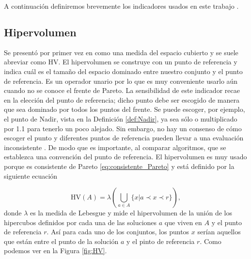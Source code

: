 A continuación definiremos brevemente los indicadores usados en este trabajo .

\subsection{Hipervolumen} \label{sec:HV}

Se presentó por primer vez en \cite{zitzlerMultiobjectiveOptimizationUsing1998} como una medida del espacio cubierto y se suele abreviar como HV. 
El hipervolumen se construye con un punto de referencia y indica cuál es el tamaño del espacio dominado entre nuestro conjunto y el punto de referencia. Es un operador unario por lo que es muy conveniente usarlo aún cuando no se conoce el frente de Pareto. La sensibilidad de este indicador recae en la elección del punto de referencia; dicho  punto debe ser escogido de manera que sea dominado por todos los puntos del frente. Se puede escoger, por ejemplo, el punto de Nadir, vista en la Definición \ref{def:Nadir}, ya sea sólo o multiplicado por 1.1 para tenerlo un poco alejado. Sin embargo, no hay un consenso de cómo escoger el punto y diferentes puntos de referencia pueden llevar a una evaluación inconsistente \cite{HV_ref_point}. De modo que es importante, al comparar algoritmos, que se establezca una convención del punto de referencia. El hipervolumen es muy usado porque es consistente de Pareto \eqref{eq:consistente_Pareto} y está definido por la siguiente ecuación 

\begin{equation} \label{eq:HV}
    \text{HV}(A)=\lambda\left( \bigcup_{a\in A} \{x|a \prec x \prec r \} \right), \nonumber
\end{equation}
donde $\lambda$ es la medida de Lebesgue y mide el hipervolumen de la unión de los hipercubos definidos por cada una de las soluciones $a$ que viven en $A$ y el punto de referencia $r$. Así para cada uno de los conjuntos, los puntos $x$ serían aquellos que están entre el punto de la solución $a$ y el pinto de referencia $r$. Como podemos ver en la Figura \ref{fig:HV}.

